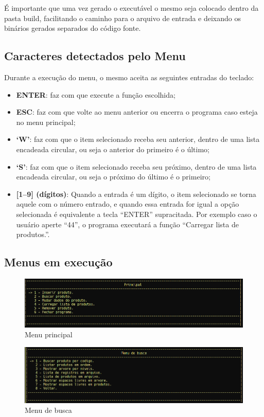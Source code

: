 \documentclass[12pt, a4paper]{article}
\begin{document}
É importante que uma vez gerado o executável o mesmo seja colocado dentro da pasta build, facilitando o caminho para o arquivo de entrada e deixando os binários gerados separados do código fonte.

\subsection{Caracteres detectados pelo Menu}\label{Caracteres detectados pelo Menu}
Durante a execução do menu, o mesmo aceita as seguintes entradas do teclado:
\begin{itemize}
    \item \textbf{ENTER}\@: faz com que execute a função escolhida;
    \item \textbf{ESC}\@: faz com que volte ao menu anterior ou encerra o programa caso esteja no menu principal;
        \item \textbf{`W'}\@: faz com que o item selecionado receba seu anterior, dentro de uma lista encadeada circular, ou seja o anterior do primeiro é o último;
        \item \textbf{`S'}\@: faz com que o item selecionado receba seu próximo, dentro de uma lista encadeada circular, ou seja o próximo do último é o primeiro;
        \item \textbf{[1--9] (dígitos)}: Quando a entrada é um dígito, o item selecionado se torna aquele com o número entrado, e quando essa entrada for igual a opção selecionada é equivalente a tecla ``ENTER'' supracitada. Por exemplo caso o usuário aperte ``44'', o programa executará a função ``Carregar lista de produtos.''.
\end{itemize}

\subsection{Menus em execução}\label{Menus em execução}
\begin{figure}[!htb]
    \centering
    \includegraphics[width=\textwidth]{principal.png}
    \caption{\label{fig:pricipal}Menu principal}
\end{figure}

\begin{figure}[!htb]
    \centering
    \includegraphics[width=\textwidth]{buscar}
    \caption{\label{fig:buscar}Menu de busca}
\end{figure}
\end{document}
